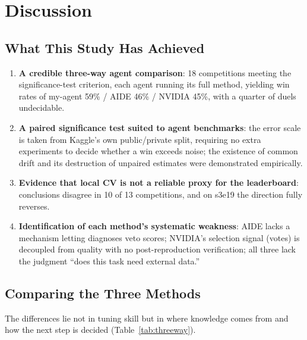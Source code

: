 \documentclass[11pt,a4paper]{article}
\begin{document}
\section{Discussion}

\subsection{What This Study Has Achieved}

\begin{enumerate}[leftmargin=*]
  \item \textbf{A credible three-way agent comparison}: 18 competitions meeting the significance-test criterion, each agent running its full method, yielding win rates of my-agent 59\% / AIDE 46\% / NVIDIA 45\%, with a quarter of duels undecidable.
  \item \textbf{A paired significance test suited to agent benchmarks}: the error scale is taken from Kaggle's own public/private split, requiring no extra experiments to decide whether a win exceeds noise; the existence of common drift and its destruction of unpaired estimates were demonstrated empirically.
  \item \textbf{Evidence that local CV is not a reliable proxy for the leaderboard}: conclusions disagree in 10 of 13 competitions, and on s3e19 the direction fully reverses.
  \item \textbf{Identification of each method's systematic weakness}: AIDE lacks a mechanism letting diagnoses veto scores; NVIDIA's selection signal (votes) is decoupled from quality with no post-reproduction verification; all three lack the judgment ``does this task need external data.''
\end{enumerate}

\subsection{Comparing the Three Methods}

The differences lie not in tuning skill but in where knowledge comes from and how the next step is decided (Table~\ref{tab:threeway}).
\end{document}
